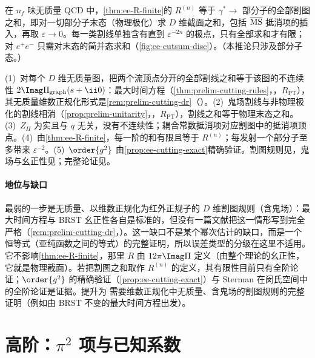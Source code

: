 \begin{corollary}\label{cor:ee-cuts}
在 $n_f$ 味无质量 QCD 中，\cref{thm:ee-R-finite}的 $R^{(n)}$ 等于 $\gamma^*\to$ 部分子的全部割图之和，即对一切部分子末态（物理极化）求 $D$ 维截面之和，包括 $\overline{\rm MS}$ 抵消项的插入，再取 $\varepsilon\to0$。每一类割线单独含有直到 $\varepsilon^{-2n}$ 的极点，只有全部求和才有限；对 $e^+e^-$ 只需对末态的简并态求和（\cref{fig:ee-cutsum-disc}）。（本推论只涉及部分子态。）
\end{corollary}
\begin{proofsketch}
(1)~对每个 $D$ 维无质量图，把两个流顶点分开的全部割线之和等于该图的不连续性 $2\Imag\Pi_{\rm graph}(s+\ii0)$：最大时间方程（\cref{thm:prelim-cutting-rules}，\tagR，$R_{\mathrm{PT}}$），其无质量维数正规化形式是\cref{rem:prelim-cutting-dr}（\tagA）。(2)~鬼场割线与非物理极化的割线相消（\cref{prop:prelim-unitarity}，\tagR，$R_{\mathrm{PT}}$），割线之和等于物理末态之和。(3)~$Z_\Pi$ 为实且与 $q$ 无关，没有不连续性；耦合常数抵消项对应割图中的抵消项顶点。(4)~由\cref{thm:ee-R-finite}，每一阶的和有限且等于 $R^{(n)}$；每发射一个部分子至多带来 $\varepsilon^{-2}$。(5)~$\order{g^2}$ 由\cref{prop:ee-cutting-exact}精确验证。割图规则见\cite{Cutkosky1960,Veltman1963,tHooftVeltman1974}，鬼场与幺正性见\cite{tHooftVeltman1972b,KugoOjima1979}；完整论证见\cite{Sterman1978a,Sterman1978b}。
\end{proofsketch}

\paragraph{地位与缺口}最弱的一步是无质量、以维数正规化为红外正规子的 $D$ 维割图规则（含鬼场）：最大时间方程与 BRST 幺正性各自是标准的，但没有一篇文献把这一情形写到完全严格（\cref{rem:prelim-cutting-dr}，\tagA）。这一缺口不是某个幂次估计的缺口，而是一个恒等式（亚纯函数之间的等式）的完整证明，所以误差类型的分级在这里不适用。它不影响\cref{thm:ee-R-finite}，那里 $R$ 由 $12\pi\Imag\Pi$ 定义（由整个理论的幺正性，它就是物理截面）。若把割图之和取作 $R^{(n)}$ 的定义，其有限性目前只有全阶论证；$\order{g^2}$ 的精确验证（\cref{prop:ee-cutting-exact}）与 Sterman 在闵氏空间中的全阶论证\cite{Sterman1978a,Sterman1978b}是证据。提升为 \tagR 需要维数正规化中无质量、含鬼场的割图规则的完整证明（例如由 BRST 不变的最大时间方程出发）。

\section{高阶：$\pi^2$ 项与已知系数}\label{sec:ee-higher}

